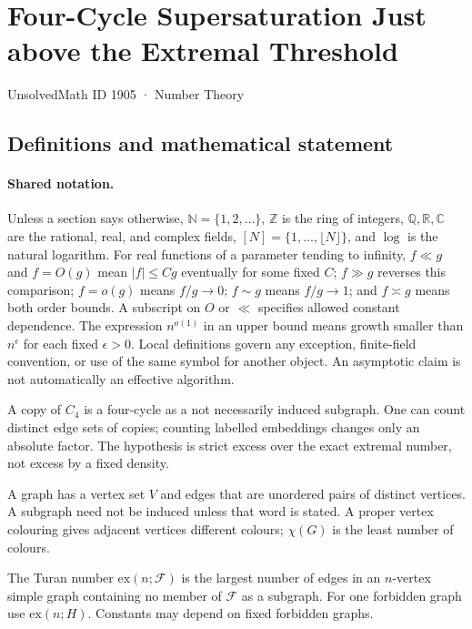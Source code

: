 \documentclass[11pt,a4paper]{article}
\newcommand{\N}{\mathbb{N}}
\newcommand{\Z}{\mathbb{Z}}
\newcommand{\Q}{\mathbb{Q}}
\newcommand{\R}{\mathbb{R}}
\newcommand{\C}{\mathbb{C}}
\begin{document}

\setcounter{section}{1904}

\section{Four-Cycle Supersaturation Just above the Extremal Threshold}\label{1905}

{\small\sffamily UnsolvedMath ID 1905 · Number Theory}

\subsection{Definitions and mathematical statement}

\paragraph{Shared notation.}Unless a section says otherwise, $\N=\{1,2,\ldots\}$,
$\Z$ is the ring of integers, $\Q,\R,\C$ are the rational, real, and complex
fields, $[N]=\{1,\ldots,\lfloor N\rfloor\}$, and $\log$ is the natural
logarithm. For real functions of a parameter tending to infinity,
$f\ll g$ and $f=O(g)$ mean $|f|\leq Cg$ eventually for some fixed $C$;
$f\gg g$ reverses this comparison; $f=o(g)$ means $f/g\to0$;
$f\sim g$ means $f/g\to1$; and $f\asymp g$ means both order bounds.
A subscript on $O$ or $\ll$ specifies allowed constant dependence.
The expression $n^{o(1)}$ in an upper bound means growth smaller than
$n^\epsilon$ for each fixed $\epsilon>0$. Local definitions govern any
exception, finite-field convention, or use of the same symbol for another
object. An asymptotic claim is not automatically an effective algorithm.



A copy of $C_4$ is a four-cycle as a not necessarily induced subgraph. One can count distinct edge sets of copies; counting labelled embeddings changes only an absolute factor. The hypothesis is strict excess over the exact extremal number, not excess by a fixed density.

A graph has a vertex set $V$ and edges that are unordered pairs of distinct vertices. A subgraph need not be induced unless that word is stated. A proper vertex colouring gives adjacent vertices different colours; $\chi(G)$ is the least number of colours.

The Turan number $\mathrm{ex}(n;\mathcal F)$ is the largest number of edges in an $n$-vertex simple graph containing no member of $\mathcal F$ as a subgraph. For one forbidden graph use $\mathrm{ex}(n;H)$. Constants may depend on fixed forbidden graphs.
\end{document}
